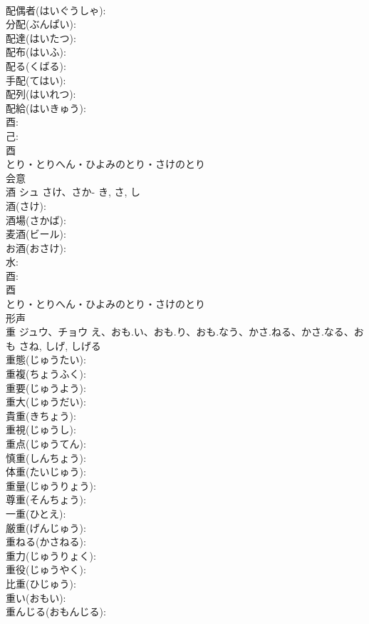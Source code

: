 \documentclass[8pt]{extreport}
\begin{document}
\begin{CJK}{UTF8}{min}
\\	配偶者(はいぐうしゃ): 
\\	分配(ぶんぱい): 
\\	配達(はいたつ): 
\\	配布(はいふ): 
\\	配る(くばる): 
\\	手配(てはい): 
\\	配列(はいれつ): 
\\	配給(はいきゅう): 
\\	酉: 
\\	己: 
\\	酉	
\\	とり・とりへん・ひよみのとり・さけのとり	
\\	会意 
\\	酒	シュ	さけ、さか-	き, さ, し	
\\	酒(さけ): 
\\	酒場(さかば): 
\\	麦酒(ビール): 
\\	お酒(おさけ): 
\\	水: 
\\	酉: 
\\	酉	
\\	とり・とりへん・ひよみのとり・さけのとり	
\\	形声 
\\	重	ジュウ、チョウ	え、おも.い、おも.り、おも.なう、かさ.ねる、かさ.なる、おも	さね, しげ, しげる	
\\	重態(じゅうたい): 
\\	重複(ちょうふく): 
\\	重要(じゅうよう): 
\\	重大(じゅうだい): 
\\	貴重(きちょう): 
\\	重視(じゅうし): 
\\	重点(じゅうてん): 
\\	慎重(しんちょう): 
\\	体重(たいじゅう): 
\\	重量(じゅうりょう): 
\\	尊重(そんちょう): 
\\	一重(ひとえ): 
\\	厳重(げんじゅう): 
\\	重ねる(かさねる): 
\\	重力(じゅうりょく): 
\\	重役(じゅうやく): 
\\	比重(ひじゅう): 
\\	重い(おもい): 
\\	重んじる(おもんじる): 

\end{CJK}
\end{document}
